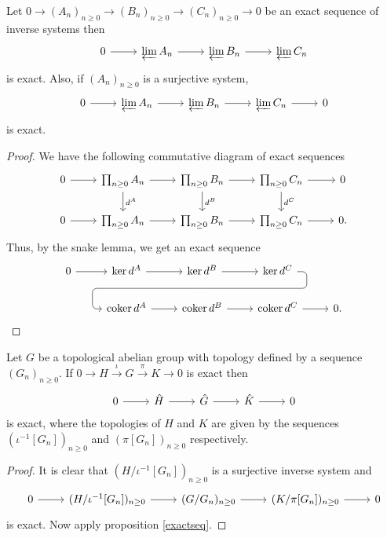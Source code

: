 \begin{prop}\label{exactseq}
    Let $0\to (A_n)_{n\geq 0}\to (B_n)_{n\geq 0}\to(C_n)_{n\geq 0}\to 0$ be an exact sequence of inverse systems then
    \[
    \begin{tikzcd}
        0 \ar[r] & \varprojlim A_n \ar[r] &  \varprojlim B_n \ar[r] & \varprojlim C_n 
    \end{tikzcd}
    \]
    is exact. Also, if $(A_n)_{n\geq 0}$ is a surjective system,
    \[
    \begin{tikzcd}
        0 \ar[r] & \varprojlim A_n \ar[r] &  \varprojlim B_n \ar[r] & \varprojlim C_n \ar[r] & 0 
    \end{tikzcd}
    \]
    is exact.
\end{prop}
\begin{proof}
    We have the following commutative diagram of exact sequences
    \[
    \begin{tikzcd}
         0 \ar[r] & \prod_{n\geq 0}A_{n} \ar[r]\ar[d, "d^A"] & \prod_{n\geq 0} B_{n} \ar[r]\ar[d, "d^B"] & \prod_{n\geq 0}C_{n} \ar[r]\ar[d, "d^C"] & 0\\
        0 \ar[r] & \prod_{n\geq 0}A_n \ar[r] & \prod_{n\geq 0}B_n \ar[r] & \prod_{n\geq 0}C_n \ar[r] & 0.
    \end{tikzcd}
    \]
    Thus, by the snake lemma, we get an exact sequence
    \[
    \begin{tikzcd}
       0 \rar & \ker d^A \rar & \ker d^B \rar
             \ar[draw=none]{d}[name=X, anchor=center]{}
    & \ker d^C \ar[rounded corners,
            to path={ -- ([xshift=2ex]\tikztostart.east)
                      |- (X.center) \tikztonodes
                      -| ([xshift=-2ex]\tikztotarget.west)
                      -- (\tikztotarget)}]{dll}[at end]{} \\      
  &\coker d^A \rar & \coker d^B \rar & \coker d^C \rar & 0.
    \end{tikzcd}
    \]
\end{proof}

\begin{coro}\label{corohat}
    Let $G$ be a topological abelian group with topology defined by a sequence $(G_n)_{n\geq 0}$. If $0\to H \overset{\iota}{\to} G\overset{\pi}{\to} K\to 0$ is exact then 
    \[
    \begin{tikzcd}
        0 \rar & \hat H \rar & \hat G \rar & \hat K \rar & 0
    \end{tikzcd}
    \]
    is exact, where the topologies of $H$ and $K$ are given by the sequences $(\iota^{-1}[G_n])_{n\geq 0}$ and $(\pi[G_n])_{n\geq 0}$ respectively.
\end{coro}
\begin{proof}
    It is clear that $(H/\iota^{-1}[G_n])_{n\geq 0}$ is a surjective inverse system and 
    \[
    \begin{tikzcd}
        0 \rar & (H/\iota^{-1}[G_n])_{n\geq 0} \rar & (G/G_n)_{n\geq 0}\rar & (K/\pi[G_n])_{n\geq 0}\rar & 0
    \end{tikzcd}
    \]
    is exact. Now apply proposition \ref{exactseq}.
\end{proof}

